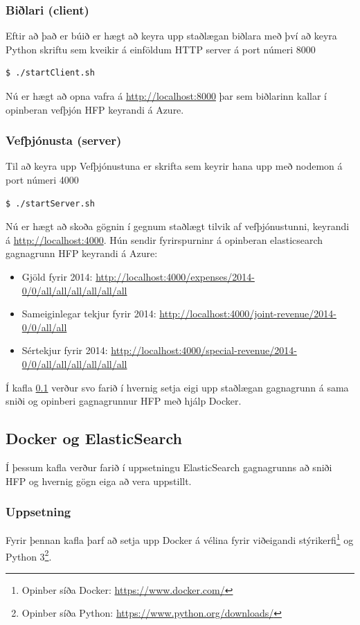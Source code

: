 \documentclass{article}
\theoremstyle{blueP}
\theoremstyle{greenS}
\begin{document}
\subsubsection{Biðlari (client)}
Eftir að það er búið er hægt að keyra upp staðlægan biðlara með því að keyra Python skriftu sem kveikir á einföldum HTTP server á port númeri 8000
\begin{lstlisting}[language=bash]
  $ ./startClient.sh
\end{lstlisting}

\noindent Nú er hægt að opna vafra á \url{http://localhost:8000} þar sem biðlarinn kallar í opinberan vefþjón HFP keyrandi á Azure.

\subsubsection{Vefþjónusta (server)}
Til að keyra upp Vefþjónustuna er skrifta sem keyrir hana upp með nodemon á port númeri 4000
\begin{lstlisting}[language=bash]
  $ ./startServer.sh
\end{lstlisting}

\noindent Nú er hægt að skoða gögnin í gegnum staðlægt tilvik af vefþjónustunni, keyrandi á \url{http://localhost:4000}. Hún sendir fyrirspurninr á opinberan elasticsearch gagnagrunn HFP keyrandi á Azure: 
\begin{itemize}
  \item Gjöld fyrir 2014: \url{http://localhost:4000/expenses/2014-0/0/all/all/all/all/all/all}
  \item Sameiginlegar tekjur fyrir 2014: \url{http://localhost:4000/joint-revenue/2014-0/0/all/all}
  \item Sértekjur fyrir 2014: \url{http://localhost:4000/special-revenue/2014-0/0/all/all/all/all/all/all}
\end{itemize}

Í kafla \ref{chapter:dockerelastic} verður svo farið í hvernig setja eigi upp staðlægan gagnagrunn á sama sniði og opinberi gagnagrunnur HFP með hjálp Docker.

\subsection{Docker og ElasticSearch}
\label{chapter:dockerelastic}
Í þessum kafla verður farið í uppsetningu ElasticSearch gagnagrunns að sniði HFP og hvernig gögn eiga að vera uppstillt.

\subsubsection{Uppsetning}
Fyrir þennan kafla þarf að setja upp Docker á vélina fyrir viðeigandi stýrikerfi\footnote{Opinber síða Docker: \url{ https://www.docker.com/}} og Python 3\footnote{Opinber síða Python: \url{ https://www.python.org/downloads/}}.
\end{document}
